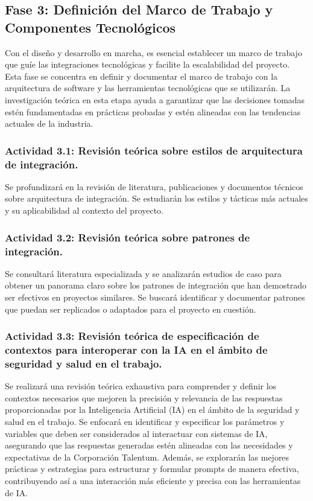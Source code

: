 \subsection{Fase 3: Definición del Marco de Trabajo y Componentes Tecnológicos}
Con el diseño y desarrollo en marcha, es esencial establecer un marco de trabajo que guíe las integraciones tecnológicas y facilite la escalabilidad del proyecto. Esta fase se concentra en definir y documentar el marco de trabajo con la arquitectura de software y las herramientas tecnológicas que se utilizarán. La investigación teórica en esta etapa ayuda a garantizar que las decisiones tomadas estén fundamentadas en prácticas probadas y estén alineadas con las tendencias actuales de la industria.

\subsubsection{Actividad 3.1: Revisión teórica sobre estilos de arquitectura de integración.}
Se profundizará en la revisión de literatura, publicaciones y documentos técnicos sobre arquitectura de integración. Se estudiarán los estilos y tácticas más actuales y su aplicabilidad al contexto del proyecto.

\subsubsection{Actividad 3.2: Revisión teórica sobre patrones de integración.}
Se consultará literatura especializada y se analizarán estudios de caso para obtener un panorama claro sobre los patrones de integración que han demostrado ser efectivos en proyectos similares. Se buscará identificar y documentar patrones que puedan ser replicados o adaptados para el proyecto en cuestión.

\subsubsection{Actividad 3.3: Revisión teórica de especificación de contextos para interoperar con la IA en el ámbito de seguridad y salud en el trabajo.}
Se realizará una revisión teórica exhaustiva para comprender y definir los contextos necesarios que mejoren la precisión y relevancia de las respuestas proporcionadas por la Inteligencia Artificial (IA) en el ámbito de la seguridad y salud en el trabajo. Se enfocará en identificar y especificar los parámetros y variables que deben ser considerados al interactuar con sistemas de IA, asegurando que las respuestas generadas estén alineadas con las necesidades y expectativas de la Corporación Talentum. Además, se explorarán las mejores prácticas y estrategias para estructurar y formular prompts de manera efectiva, contribuyendo así a una interacción más eficiente y precisa con las herramientas de IA.

